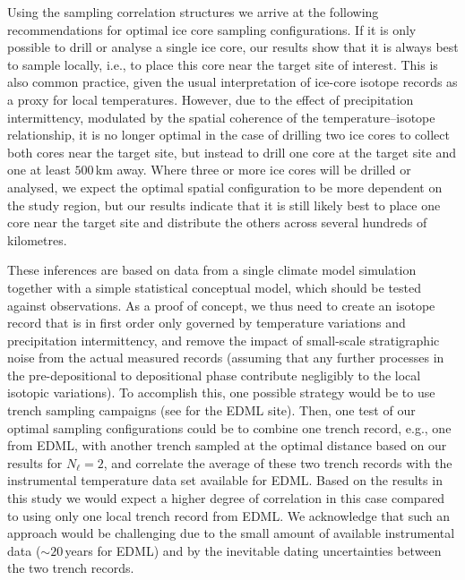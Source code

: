 \documentclass[cp, manuscript]{copernicus}
\begin{document}
Using the sampling correlation structures we arrive at the following
recommendations for optimal ice core sampling configurations. If it is only
possible to drill or analyse a single ice core, our results show that it is
always best to sample locally, i.e., to place this core near the target site of
interest. This is also common practice, given the usual interpretation of
ice-core isotope records as a proxy for local temperatures. However, due to the
effect of precipitation intermittency, modulated by the spatial coherence of the
temperature--isotope relationship, it is no longer optimal in the case of
drilling two ice cores to collect both cores near the target site, but instead
to drill one core at the target site and one at least $500$\,km away. Where
three or more ice cores will be drilled or analysed, we expect the optimal
spatial configuration to be more dependent on the study region, but our results
indicate that it is still likely best to place one core near the target site and
distribute the others across several hundreds of kilometres.

These inferences are based on data from a single climate model simulation
together with a simple statistical conceptual model, which should be tested
against observations. As a proof of concept, we thus need to create an isotope
record that is in first order only governed by temperature variations and
precipitation intermittency, and remove the impact of small-scale stratigraphic
noise from the actual measured records (assuming that any further processes in
the pre-depositional to depositional phase contribute negligibly to the local
isotopic variations). To accomplish this, one possible strategy would be to use
trench sampling campaigns (see \citealp{Munch2016,Munch2017} for the EDML
site). Then, one test of our optimal sampling configurations could be to combine
one trench record, e.g., one from EDML, with another trench sampled at the
optimal distance based on our results for $N_{\ell}=2$, and correlate the
average of these two trench records with the instrumental temperature data set
available for EDML. Based on the results in this study we would expect a higher
degree of correlation in this case compared to using only one local trench
record from EDML. We acknowledge that such an approach would be challenging due
to the small amount of available instrumental data ($\sim20$\,years for EDML)
and by the inevitable dating uncertainties between the two trench records.
\end{document}
